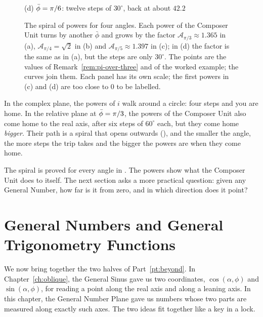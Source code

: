 \begin{figure}[tb]
\begin{minipage}[b]{0.48\textwidth}
\smallskip
{\small (d) $\bar{\phi} = \pi/6$: twelve steps of $30^\circ$, back at about $42.2$\par}
\end{minipage}
\caption[The spiral of powers]{The spiral of powers for four angles. Each power of the Composer Unit turns by another $\bar{\phi}$ and grows by the factor $\mathcal{A}_{\pi/3} \approx 1.365$ in (a), $\mathcal{A}_{\pi/4} = \sqrt{2}$ in (b) and $\mathcal{A}_{\pi/5} \approx 1.397$ in (c); in (d) the factor is the same as in (a), but the steps are only $30^\circ$. The points are the values of Remark~\ref{rem:pi-over-three} and of the worked example; the curves join them. Each panel has its own scale; the first powers in (c) and (d) are too close to $0$ to be labelled.}
\label{fig:spiral}
\end{figure}

\begin{plainwords}
In the complex plane, the powers of $i$ walk around a circle: four steps and you are home. In the relative plane at $\bar{\phi} = \pi/3$, the powers of the Composer Unit also come home to the real axis, after six steps of $60^\circ$ each, but they come home \emph{bigger}. Their path is a spiral that opens outwards (), and the smaller the angle, the more steps the trip takes and the bigger the powers are when they come home.
\end{plainwords}

The spiral is proved for every angle in \citet[Proposition~5.6]{DerrazGNPreprint2026}. The powers show what the Composer Unit does to itself. The next section asks a more practical question: given any General Number, how far is it from zero, and in which direction does it point?

\section[General Numbers and General Trigonometry]{General Numbers and General\\ Trigonometry Functions}\label{sec:gn-trig}

We now bring together the two halves of Part~\ref{pt:beyond}. In Chapter~\ref{ch:oblique}, the General Sinus gave us two coordinates, $\cos(\alpha, \phi)$ and $\sin(\alpha, \phi)$, for reading a point along the real axis and along a leaning axis. In this chapter, the General Number Plane gave us numbers whose two parts are measured along exactly such axes. The two ideas fit together like a key in a lock.

